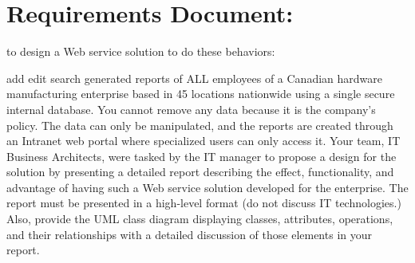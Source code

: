 \section{Requirements Document:}

to design a Web service solution to do these behaviors:

add
edit
search 
generated reports of ALL employees of a Canadian hardware manufacturing enterprise based in 45 locations nationwide using a single secure internal database. You cannot remove any data because it is the company’s policy. The data can only be manipulated, and the reports are created through an Intranet web portal where specialized users can only access it.
Your team, IT Business Architects, were tasked by the IT manager to propose a design for the solution by presenting a detailed report describing the effect, functionality, and advantage of having such a Web service solution developed for the enterprise. The report must be presented in a high-level format (do not discuss IT technologies.) Also, provide the UML class diagram displaying classes, attributes, operations, and their relationships with a detailed discussion of those elements in your report.
